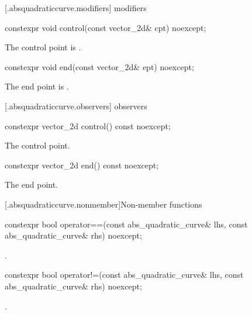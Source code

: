  [\iotwod.absquadraticcurve.modifiers]{ modifiers}

%
\begin{itemdecl}
constexpr void control(const vector_2d& cpt) noexcept;
\end{itemdecl}
\begin{itemdescr}
\pnum
\effects
The control point is .
\end{itemdescr}

%
\begin{itemdecl}
constexpr void end(const vector_2d& ept) noexcept;
\end{itemdecl}
\begin{itemdescr}
\pnum
\effects
The end point is .
\end{itemdescr}

 [\iotwod.absquadraticcurve.observers]{ observers}

%
\begin{itemdecl}
constexpr vector_2d control() const noexcept;
\end{itemdecl}
\begin{itemdescr}
\pnum
\returns
The control point.
\end{itemdescr}

%
\begin{itemdecl}
constexpr vector_2d end() const noexcept;
\end{itemdecl}
\begin{itemdescr}
\pnum
\returns
The end point.
\end{itemdescr}

 [\iotwod.absquadraticcurve.nonmember]{Non-member functions}

%
\begin{itemdecl}
constexpr bool operator==(const abs_quadratic_curve& lhs,
  const abs_quadratic_curve& rhs) noexcept;
\end{itemdecl}
\begin{itemdescr}
\pnum
\returns
{}.
\end{itemdescr}

%
\begin{itemdecl}
constexpr bool operator!=(const abs_quadratic_curve& lhs,
  const abs_quadratic_curve& rhs) noexcept;
\end{itemdecl}
\begin{itemdescr}
\pnum
\returns
{}.
\end{itemdescr}
